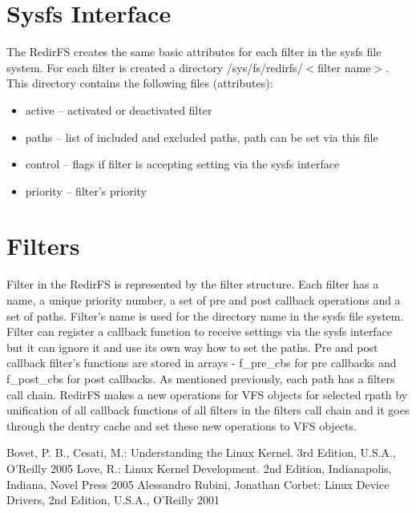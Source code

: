 \documentclass[oneside, 11pt, a4]{article}
\begin{document}
\section{Sysfs Interface}
The RedirFS creates the same basic attributes for each filter in the sysfs file
system. For each filter is created a directory /sys/fs/redirfs/$<$filter name$>$.
This directory contains the following files (attributes):

\begin{itemize}
\item active -- activated or deactivated filter
\item paths -- list of included and excluded paths, path can be set via this file
\item control -- flags if filter is accepting setting via the sysfs interface
\item priority -- filter's priority
\end{itemize}

\section{Filters}
Filter in the RedirFS is represented by the filter structure. Each filter has a
name, a unique priority number, a set of pre and post callback operations and a
set of paths. Filter's name is used for the directory name in the sysfs file
system. Filter can register a callback function to receive settings via the
sysfs interface but it can ignore it and use its own way how to set the paths.
Pre and post callback filter's functions are stored in arrays - f\_pre\_cbs for
pre callbacks and f\_post\_cbs for post callbacks. As mentioned previously, each
path has a filters call chain. RedirFS makes a new operations for VFS objects
for selected rpath by unification of all callback functions of all filters in
the filters call chain and it goes through the dentry cache and set these new
operations to VFS objects.

\begin{thebibliography}{99}
  Bovet, P. B., Cesati, M.: Understanding the Linux Kernel. 3rd
Edition, U.S.A., O'Reilly 2005
 Love, R.: Linux Kernel Development. 2nd Edition, Indianapolis,
Indiana, Novel Press 2005
  Alessandro Rubini, Jonathan Corbet: Linux Device Drivers, 2nd Edition,
U.S.A., O'Reilly 2001
\end{thebibliography}
\end{document}
